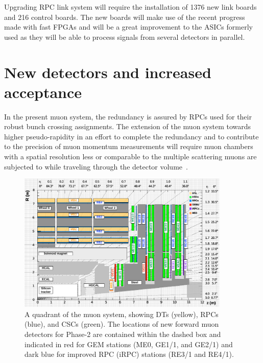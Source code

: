 	Upgrading RPC link system will require the installation of 1376 new link boards and 216 control boards. The new boards will make use of the recent progress made with fast FPGAs and will be a great improvement to the ASICs formerly used as they will be able to process signals from several detectors in parallel.

\section{New detectors and increased acceptance}
\label{chapt3:sec:GEMRPC}

	In the present muon system, the redundancy is assured by RPCs used for their robust bunch crossing assignments. The extension of the muon system towards higher pseudo-rapidity in an effort to complete the redundancy and to contribute to the precision of muon momentum measurements will require muon chambers with a spatial resolution less or comparable to the multiple scattering muons are subjected to while traveling through the detector volume~\cite{MUONTDR}. 
	
	\begin{figure}[H]
		\centering
		\includegraphics[width=0.9\textwidth]{fig/chapt3/Phase2_Muon_quadrant.pdf}
		\caption{\label{fig:P2Quadrant} A quadrant of the muon system, showing DTs (yellow), RPCs (blue), and CSCs (green). The locations of new forward muon detectors for Phase-2 are contained within the dashed box and indicated in red for GEM stations (ME0, GE1/1, and GE2/1) and dark blue for improved RPC (iRPC) stations (RE3/1 and RE4/1).}
	\end{figure}

\begingroup\setlength{\intextsep}{5pt}\setlength{\columnsep}{15pt}

